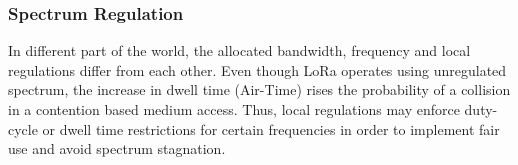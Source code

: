 

\subsubsection{Spectrum Regulation}
In different part of the world, the allocated bandwidth, frequency and local
regulations differ from each other. Even though LoRa operates using
unregulated spectrum, the increase in dwell time (Air-Time) rises the
probability of a collision in a contention based medium access. Thus, local
regulations may enforce duty-cycle or dwell time restrictions for certain
frequencies in order to implement fair use and avoid spectrum stagnation.


